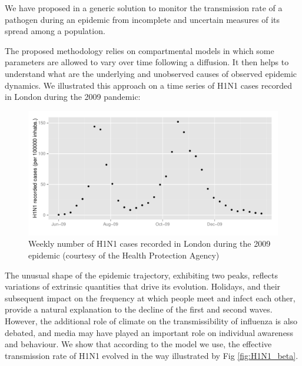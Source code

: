 \documentclass[a4paper,11pt,titlepage]{article}
\theoremstyle{plain} %
\begin{document}
We have proposed in \cite{Dureau2013a}  a generic solution to monitor the transmission rate of a pathogen during an epidemic from incomplete and uncertain  measures of its spread among a population. 

The proposed methodology relies on compartmental models in which some parameters are allowed to vary over time
following a diffusion. It then helps to understand what are the underlying and unobserved causes of observed epidemic 
dynamics. We illustrated this approach on a time series of H1N1 cases recorded in London during the 2009 pandemic:

\begin{figure}[H]
\begin{centering}
\includegraphics[scale=0.7]{H1N1_data.pdf}
\par\end{centering}

\caption{\label{fig:H1N1_data}Weekly number of H1N1 cases recorded in London during the 2009 epidemic (courtesy of the Health Protection Agency)}
\end{figure}


The unusual shape of the epidemic trajectory, exhibiting two peaks, reflects variations of extrinsic quantities that drive its evolution. Holidays, and their subsequent impact on the frequency at which people meet and infect  each other, provide a natural explanation to the decline of the first and second waves. However, the additional role of climate on the transmissibility of influenza is also debated, and media may have played an important role on individual awareness and behaviour. We show that according to the model we use, the effective transmission rate of H1N1 evolved in the  way illustrated by Fig \ref{fig:H1N1_beta}.
\end{document}
